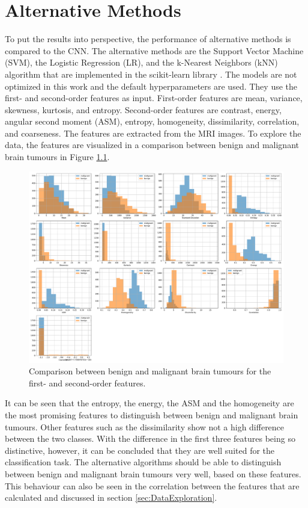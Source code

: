 \chapter{Alternative Methods}
\label{cha:alternative_methods}

To put the results into perspective, the performance of alternative methods is compared to the CNN.
The alternative methods are the Support Vector Machine (SVM), the Logistic Regression (LR), and the k-Nearest Neighbors (kNN) algorithm that are implemented in the scikit-learn library \cite{scikit-learn}.
The models are not optimized in this work and the default hyperparameters are used.
They use the first- and second-order features as input.
First-order features are mean, variance, skewness, kurtosis, and entropy.
Second-order features are contrast, energy, angular second moment (ASM), entropy, homogeneity, dissimilarity, correlation, and coarseness.
The features are extracted from the MRI images. %
To explore the data, the features are visualized in a comparison between benign and malignant brain tumours in Figure \ref{fig:benign_malignant_comparison}.
\begin{figure}[H]
    \centering
    \includegraphics[width=.8\textwidth]{plots/benign_malignant_comparison.pdf}
    \caption{Comparison between benign and malignant brain tumours for the first- and second-order features.}
    \label{fig:benign_malignant_comparison}
\end{figure}
It can be seen that the entropy, the energy, the ASM and the homogeneity are the most promising features to distinguish between benign and malignant brain tumours.
Other features such as the dissimilarity show not a high difference between the two classes.
With the difference in the first three features being so distinctive, however, it can be concluded that they are well suited for the classification task.
The alternative algorithms should be able to distinguish between benign and malignant brain tumours very well, based on these features.
This behaviour can also be seen in the correlation between the features that are calculated and discussed in section \ref{sec:DataExploration}.

